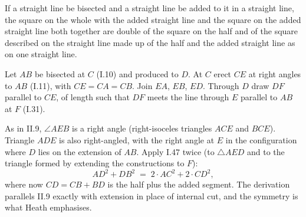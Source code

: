 \begin{claim}
\label{prop:II.10}
If a straight line be bisected and a straight line be added to it in
a straight line, the square on the whole with the added straight line
and the square on the added straight line both together are double of
the square on the half and of the square described on the straight
line made up of the half and the added straight line as on one
straight line.
\end{claim}
\begin{evidence}[Proof of II.10]
\label{ev:II.10}
Let $AB$ be bisected at $C$ (I.10) and produced to $D$.  At $C$ erect
$CE$ at right angles to $AB$ (I.11), with $CE = CA = CB$.  Join $EA$,
$EB$, $ED$.  Through $D$ draw $DF$ parallel to $CE$, of length such
that $DF$ meets the line through $E$ parallel to $AB$ at $F$ (I.31).

As in II.9, $\angle AEB$ is a right angle (right-isoceles triangles
$ACE$ and $BCE$).  Triangle $ADE$ is also right-angled, with the
right angle at $E$ in the configuration where $D$ lies on the
extension of $AB$.  Apply I.47 twice (to $\triangle AED$ and to the
triangle formed by extending the constructions to $F$):
\[
    AD^2 + DB^2 \;=\; 2\cdot AC^2 + 2\cdot CD^2,
\]
where now $CD = CB + BD$ is the half plus the added segment.  The
derivation parallels II.9 exactly with extension in place of internal
cut, and the symmetry is what Heath emphasises.
\end{evidence}

